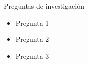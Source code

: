 \begin{frame}{\color{blue}Preguntas de investigación}

  \begin{itemize}
  \item Pregunta 1\\  %
  \item Pregunta 2\\  %
  \item Pregunta 3\\  %
  \end{itemize}


\end{frame}
